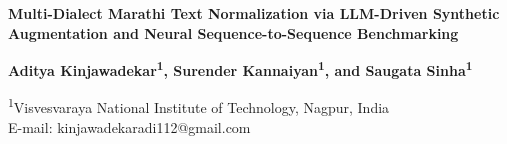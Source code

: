 \documentclass[11pt, a4paper]{article}
\begin{document}
\begin{center}
{\fontsize{14pt}{20pt}\selectfont\bfseries Multi-Dialect Marathi Text Normalization via LLM-Driven Synthetic Augmentation and Neural Sequence-to-Sequence Benchmarking}

\vspace{48pt}

{\fontsize{12pt}{16pt}\selectfont\bfseries Aditya Kinjawadekar\textsuperscript{1}, Surender Kannaiyan\textsuperscript{1}, and Saugata Sinha\textsuperscript{1}}

\vspace{18pt}

{\fontsize{11pt}{16pt}\selectfont
\textsuperscript{1}Visvesvaraya National Institute of Technology, Nagpur, India\\[6pt]
E-mail: kinjawadekaradi112@gmail.com}
\end{center}

\vspace{42pt}



\small

\end{document}

